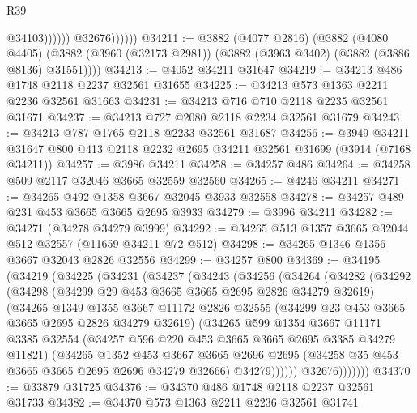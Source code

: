 \begin{lexlean}{R39}
\begin{coremodule}
                            @34103))))))
                @32676))))))
@34211 := @3882
    (@4077 @2816)
    (@3882
      (@4080 @4405)
      (@3882 (@3960 (@32173 @2981)) (@3882 (@3963 @3402) (@3882 (@3886 @8136) @31551))))
@34213 := @4052 @34211 @31647
@34219 := @34213 @486 @1748 @2118 @2237 @32561 @31655
@34225 := @34213 @573 @1363 @2211 @2236 @32561 @31663
@34231 := @34213 @716 @710 @2118 @2235 @32561 @31671
@34237 := @34213 @727 @2080 @2118 @2234 @32561 @31679
@34243 := @34213 @787 @1765 @2118 @2233 @32561 @31687
@34256 := @3949
    @34211
    @31647
    @800
    @413
    @2118
    @2232
    @2695
    @34211
    @32561
    @31699
    (@3914 (@7168 @34211))
@34257 := @3986 @34211
@34258 := @34257 @486
@34264 := @34258 @509 @2117 @32046 @3665 @32559 @32560
@34265 := @4246 @34211
@34271 := @34265 @492 @1358 @3667 @32045 @3933 @32558
@34278 := @34257 @489 @231 @453 @3665 @3665 @2695 @3933
@34279 := @3996 @34211
@34282 := @34271 (@34278 @34279 @3999)
@34292 := @34265 @513 @1357 @3665 @32044 @512 @32557 (@11659 @34211 @72 @512)
@34298 := @34265 @1346 @1356 @3667 @32043 @2826 @32556
@34299 := @34257 @800
@34369 := @34195
    (@34219
      (@34225
        (@34231
          (@34237
            (@34243
              (@34256
                (@34264
                  (@34282
                    (@34292
                      (@34298
                        (@34299 @29 @453 @3665 @3665 @2695 @2826 @34279 @32619)
                        (@34265
                          @1349
                          @1355
                          @3667
                          @11172
                          @2826
                          @32555
                          (@34299 @23 @453 @3665 @3665 @2695 @2826 @34279 @32619)
                          (@34265
                            @599
                            @1354
                            @3667
                            @11171
                            @3385
                            @32554
                            (@34257 @596 @220 @453 @3665 @3665 @2695 @3385 @34279 @11821)
                            (@34265
                              @1352
                              @453
                              @3667
                              @3665
                              @2696
                              @2695
                              (@34258 @35 @453 @3665 @3665 @2695 @2696 @34279 @32666)
                              @34279))))))
                  @32676)))))))
@34370 := @33879 @31725
@34376 := @34370 @486 @1748 @2118 @2237 @32561 @31733
@34382 := @34370 @573 @1363 @2211 @2236 @32561 @31741

\end{coremodule}
\end{lexlean}
